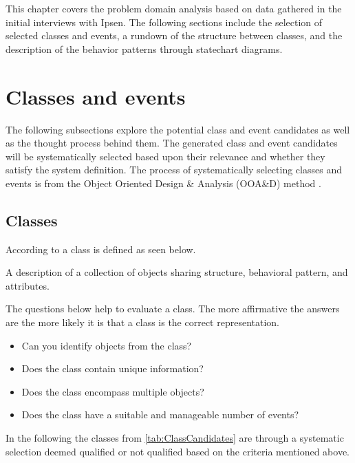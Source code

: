 This chapter covers the problem domain analysis based on data gathered in the initial interviews with Ipsen.
The following sections include the selection of selected classes and events, a rundown of the structure between classes, and the description of the behavior patterns through statechart diagrams.

\section{Classes and events}
The following subsections explore the potential class and event candidates as well as the thought process behind them.
The generated class and event candidates will be systematically selected based upon their relevance and whether they satisfy the system definition.
The process of systematically selecting classes and events is from the Object Oriented Design \& Analysis (OOA\&D) method \cite{Rod-Aalborg}.

\subsection{Classes} \label{sec:Classes}
According to  \citep[p.~55]{Rod-Aalborg} a class is defined as seen below.
\begin{defn}\label{defn:class}
	A description of a collection of objects sharing structure, behavioral pattern, and attributes.
\end{defn}

The questions below help to evaluate a class. The more affirmative the answers are the more likely it is that a class is the correct representation. \citep[p.~62]{Rod-Aalborg}
\begin{itemize}
	\item Can you identify objects from the class?
	\item Does the class contain unique information?
	\item Does the class encompass multiple objects?
	\item Does the class have a suitable and manageable number of events?
\end{itemize}

In the following the classes from \cref{tab:ClassCandidates} are through a systematic selection deemed qualified or not qualified based on the criteria mentioned above.

